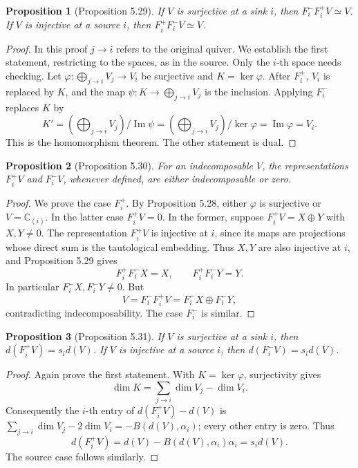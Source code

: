\documentclass[UTF8,11pt,a4paper]{ctexart}
\newtheorem*{proposition}{Proposition}
\theoremstyle{definition}\newtheorem*{definition}{Definition}
\theoremstyle{remark}\newtheorem*{remark}{Remark}
\DeclareMathOperator{\im}{Im}
\newcommand{\C}{\mathbb C}
\begin{document}
\begin{proposition}[Proposition 5.29]
If $V$ is surjective at a sink $i$, then $F_i^-F_i^+V\simeq V$. If $V$ is injective at a source $i$, then $F_i^+F_i^-V\simeq V$.
\end{proposition}
\begin{proof}
In this proof $j\to i$ refers to the original quiver. We establish the first statement, restricting to the spaces, as in the source. Only the $i$-th space needs checking. Let $\varphi:\bigoplus_{j\to i}V_j\to V_i$ be surjective and $K=\ker\varphi$. After $F_i^+$, $V_i$ is replaced by $K$, and the map $\psi:K\to\bigoplus_{j\to i}V_j$ is the inclusion. Applying $F_i^-$ replaces $K$ by
\[
K'=\left(\bigoplus_{j\to i}V_j\right)/\im\psi
=\left(\bigoplus_{j\to i}V_j\right)/\ker\varphi
=\im\varphi=V_i.
\]
This is the homomorphism theorem. The other statement is dual.
\end{proof}

\begin{proposition}[Proposition 5.30]
For an indecomposable $V$, the representations $F_i^+V$ and $F_i^-V$, whenever defined, are either indecomposable or zero.
\end{proposition}
\begin{proof}
We prove the case $F_i^+$. By Proposition 5.28, either $\varphi$ is surjective or $V=\C_{(i)}$. In the latter case $F_i^+V=0$. In the former, suppose $F_i^+V=X\oplus Y$ with $X,Y\ne0$. The representation $F_i^+V$ is injective at $i$, since its maps are projections whose direct sum is the tautological embedding. Thus $X,Y$ are also injective at $i$, and Proposition 5.29 gives
\[
F_i^+F_i^-X=X,\qquad F_i^+F_i^-Y=Y.
\]
In particular $F_i^-X,F_i^-Y\ne0$. But
\[
V=F_i^-F_i^+V=F_i^-X\oplus F_i^-Y,
\]
contradicting indecomposability. The case $F_i^-$ is similar.
\end{proof}

\begin{proposition}[Proposition 5.31]
If $V$ is surjective at a sink $i$, then $d(F_i^+V)=s_i d(V)$. If $V$ is injective at a source $i$, then $d(F_i^-V)=s_i d(V)$.
\end{proposition}
\begin{proof}
Again prove the first statement. With $K=\ker\varphi$, surjectivity gives
\[
\dim K=\sum_{j\to i}\dim V_j-\dim V_i.
\]
Consequently the $i$-th entry of $d(F_i^+V)-d(V)$ is $\sum_{j\to i}\dim V_j-2\dim V_i=-B(d(V),\alpha_i)$; every other entry is zero. Thus
\[
d(F_i^+V)=d(V)-B(d(V),\alpha_i)\alpha_i=s_i d(V).
\]
The source case follows similarly.
\end{proof}
\end{document}
